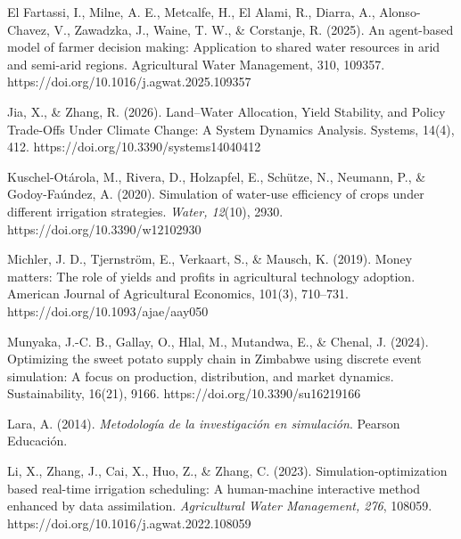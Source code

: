 \documentclass[12pt]{report}
\begin{document}
\begin{thebibliography}{}
\vspace{0.3cm} 
\bibitem{}\hypertarget{ref:elfartassi2025}{El Fartassi, I., Milne, A. E., Metcalfe, H., El Alami, R., Diarra, A., Alonso-Chavez, V., Zawadzka, J., Waine, T. W., \& Corstanje, R. (2025). An agent-based model of farmer decision making: Application to shared water resources in arid and semi-arid regions. Agricultural Water Management, 310, 109357.
https://doi.org/10.1016/j.agwat.2025.109357}

\vspace{0.3cm} 
\bibitem{}\hypertarget{ref:jia2026}{Jia, X., \& Zhang, R. (2026). Land–Water Allocation, Yield Stability, and Policy Trade-Offs Under Climate Change: A System Dynamics Analysis. Systems, 14(4), 412. 
https://doi.org/10.3390/systems14040412}

\vspace{0.3cm} 
\bibitem{}\hypertarget{ref:kuschel2020}{Kuschel-Otárola, M., Rivera, D., Holzapfel, E., Schütze, N., Neumann, P., \& Godoy-Faúndez, A. (2020). Simulation of water-use efficiency of crops under different irrigation strategies. \textit{Water, 12}(10), 2930. https://doi.org/10.3390/w12102930}


\vspace{0.3cm} 
\bibitem{}\hypertarget{ref:michler2019}{Michler, J. D., Tjernström, E., Verkaart, S., \& Mausch, K. (2019). Money matters: The role of yields and profits in agricultural technology adoption. American Journal of Agricultural Economics, 101(3), 710–731. https://doi.org/10.1093/ajae/aay050}

\vspace{0.3cm} 
\bibitem{}\hypertarget{ref:munyaka2024}{Munyaka, J.-C. B., Gallay, O., Hlal, M., Mutandwa, E., \& Chenal, J. (2024). Optimizing the sweet potato supply chain in Zimbabwe using discrete event simulation: A focus on production, distribution, and market dynamics. Sustainability, 16(21), 9166. https://doi.org/10.3390/su16219166}

\vspace{0.3cm} 
\bibitem{}\hypertarget{ref:lara2014}{Lara, A. (2014). \textit{Metodología de la investigación en simulación}. Pearson Educación.}

\vspace{0.3cm} 
\bibitem{}\hypertarget{ref:li2023}{Li, X., Zhang, J., Cai, X., Huo, Z., \& Zhang, C. (2023). Simulation-optimization based real-time irrigation scheduling: A human-machine interactive method enhanced by data assimilation. \textit{Agricultural Water Management, 276}, 108059. https://doi.org/10.1016/j.agwat.2022.108059}


\end{thebibliography}
\end{document}
